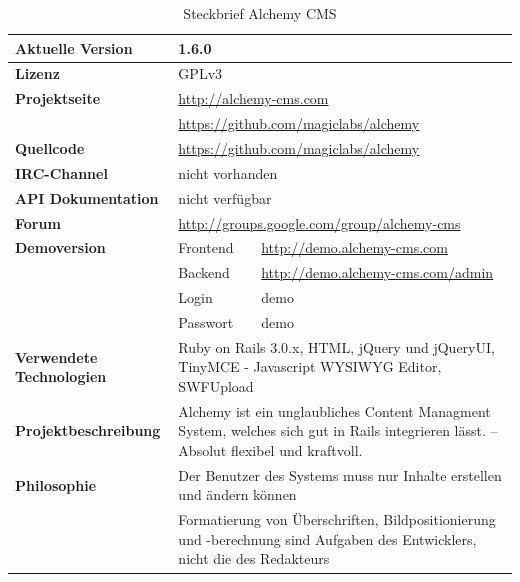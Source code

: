 \begin{table}[!h]
\caption{Steckbrief Alchemy CMS}
\begin{tabular}[!ht]{|l|l|l|}
\hline
\textbf{Aktuelle Version} & \multicolumn{2}{p{10cm}|}{1.6.0} \\
\hline
\textbf{Lizenz} & \multicolumn{2}{p{10cm}|}{GPLv3} \\
\hline
\textbf{Projektseite} & \multicolumn{2}{p{10cm}|}{\href{http://alchemy-cms.com}{http://alchemy-cms.com}} \\
 & \multicolumn{2}{p{10cm}|}{\href{https://github.com/magiclabs/alchemy}{https://github.com/magiclabs/alchemy}} \\
\hline
\textbf{Quellcode} & \multicolumn{2}{p{10cm}|}{\href{https://github.com/magiclabs/alchemy}{https://github.com/magiclabs/alchemy}} \\
\hline
\textbf{IRC-Channel} & \multicolumn{2}{p{10cm}|}{nicht vorhanden} \\
\hline
\textbf{API Dokumentation} & \multicolumn{2}{p{10cm}|}{nicht verfügbar} \\
\hline
\textbf{Forum} & \multicolumn{2}{p{10cm}|}{\href{http://groups.google.com/group/alchemy-cms}{http://groups.google.com/group/alchemy-cms}} \\
\hline
\textbf{Demoversion} & Frontend & \href{http://demo.alchemy-cms.com}{http://demo.alchemy-cms.com} \\
\cline{2-3}
& Backend & \href{http://demo.alchemy-cms.com/admin}{http://demo.alchemy-cms.com/admin} \\
\cline{2-3}
& Login & demo \\
\cline{2-3}
& Passwort & demo \\
\hline
\textbf{Verwendete Technologien} & \multicolumn{2}{p{10cm}|}{Ruby on Rails 3.0.x, HTML, jQuery und jQueryUI, TinyMCE - Javascript WYSIWYG Editor, SWFUpload} \\
\hline
\textbf{Projektbeschreibung} & \multicolumn{2}{p{10cm}|}{Alchemy ist ein unglaubliches Content Managment System, welches sich gut in Rails integrieren lässt. – Absolut flexibel und kraftvoll.} \\
\hline
\textbf{Philosophie} & \multicolumn{2}{p{10cm}|}{Der Benutzer des Systems muss nur Inhalte erstellen und ändern können} \\
& \multicolumn{2}{p{10cm}|}{Formatierung von Überschriften, Bildpositionierung und -berechnung sind Aufgaben des Entwicklers, nicht die des Redakteurs}\\
\hline
\end{tabular}
\end{table}

